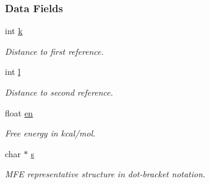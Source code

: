 \subsubsection*{Data Fields}
\begin{DoxyCompactItemize}
\item 
\hypertarget{group__kl__neighborhood__mfe_ac111e850bb3b3a11b6b5707912cfa1b8}{}int \hyperlink{group__kl__neighborhood__mfe_ac111e850bb3b3a11b6b5707912cfa1b8}{k}\label{group__kl__neighborhood__mfe_ac111e850bb3b3a11b6b5707912cfa1b8}

\begin{DoxyCompactList}\small\item\em Distance to first reference. \end{DoxyCompactList}\item 
\hypertarget{group__kl__neighborhood__mfe_ab8e95cd920901175a2cc8de726ab1d36}{}int \hyperlink{group__kl__neighborhood__mfe_ab8e95cd920901175a2cc8de726ab1d36}{l}\label{group__kl__neighborhood__mfe_ab8e95cd920901175a2cc8de726ab1d36}

\begin{DoxyCompactList}\small\item\em Distance to second reference. \end{DoxyCompactList}\item 
\hypertarget{group__kl__neighborhood__mfe_a7577863a6a84224dfee39b321c03cab1}{}float \hyperlink{group__kl__neighborhood__mfe_a7577863a6a84224dfee39b321c03cab1}{en}\label{group__kl__neighborhood__mfe_a7577863a6a84224dfee39b321c03cab1}

\begin{DoxyCompactList}\small\item\em Free energy in kcal/mol. \end{DoxyCompactList}\item 
\hypertarget{group__kl__neighborhood__mfe_ac5942d2505a6cd7e4a8073a321d5d2d5}{}char $\ast$ \hyperlink{group__kl__neighborhood__mfe_ac5942d2505a6cd7e4a8073a321d5d2d5}{s}\label{group__kl__neighborhood__mfe_ac5942d2505a6cd7e4a8073a321d5d2d5}

\begin{DoxyCompactList}\small\item\em M\+F\+E representative structure in dot-\/bracket notation. \end{DoxyCompactList}\end{DoxyCompactItemize}
\label{structTwoDfold__vars}
\hypertarget{group__kl__neighborhood__mfe_structTwoDfold__vars}{}
